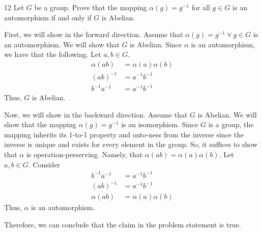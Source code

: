 \begin{hwproblem}
{12}{
    Let \(G\) be a group. Prove that the mapping \(\alpha(g) = g^{-1}\) for all \(g \in G\) is an automorphism if and only if \(G\) is Abelian.
}

First, we will show in the forward direction. Assume that \(\alpha(g) = g^{-1} \ \forall \  g \in G\) is an automorphism. We will show that \(G\) is Abelian. Since \(\alpha\) is an automorphism, we have that the following. Let \(a, b \in G\).
\[
\begin{aligned}
    \alpha(ab) &= \alpha(a)\alpha(b) \\
    (ab)^{-1} &= a^{-1}b^{-1} \\
    b^{-1}a^{-1} &= a^{-1}b^{-1} 
\end{aligned}
\]
Thus, \(G\) is Abelian.

Now, we will show in the backward direction. Assume that \(G\) is Abelian. We will show that the mapping \(\alpha(g) = g^{-1}\) is an isomorphism. Since \(G\) is a group, the mapping inherits its 1-to-1 property and onto-ness from the inverse since the inverse is unique and exists for every element in the group. So, it suffices to show that \(\alpha\) is operation-perserving. Namely, that \(\alpha(ab) = \alpha(a)\alpha(b)\). Let \(a, b \in G\). Consider
\[
\begin{aligned}
    b^{-1}a^{-1} &= a^{-1}b^{-1} \\
    (ab)^{-1} &= a^{-1}b^{-1} \\
    \alpha(ab) &= \alpha(a)\alpha(b)
\end{aligned}
\]
Thus, \(\alpha\) is an automorphism.

Therefore, we can conclude that the claim in the problem statement is true.
\end{hwproblem}

